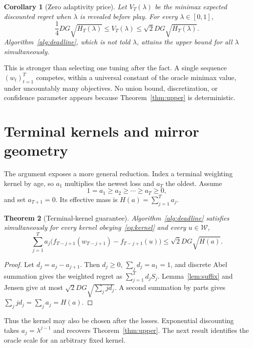 \documentclass{article}
\newtheorem{theorem}{Theorem}
\newtheorem{corollary}[theorem]{Corollary}
\newcommand{\W}{\mathcal W}
\begin{document}
\begin{corollary}[Zero adaptivity price]
\label{cor:minimax}
Let $V_T(\lambda)$ be the minimax expected discounted regret when $\lambda$ is revealed before play. For every $\lambda\in[0,1]$, \[ \frac14DG\sqrt{H_T(\lambda)}\le V_T(\lambda)\le\sqrt2DG\sqrt{H_T(\lambda)}. \] Algorithm~\ref{alg:deadline}, which is not told $\lambda$, attains the upper bound for all $\lambda$ simultaneously.
\end{corollary}

This is stronger than selecting one tuning after the fact. A single sequence $(w_t)_{t=1}^T$ competes, within a universal constant of the oracle minimax value, under uncountably many objectives. No union bound, discretization, or confidence parameter appears because Theorem~\ref{thm:upper} is deterministic.

\section{Terminal kernels and mirror geometry}
\label{sec:general}

The argument exposes a more general reduction. Index a terminal weighting kernel by age, so $a_1$ multiplies the newest loss and $a_T$ the oldest. Assume
\begin{equation}
1=a_1\ge a_2\ge\cdots\ge a_T\ge0,
\label{eq:kernel}
\end{equation}
and set $a_{T+1}=0$. Its effective mass is $H(a)=\sum_{j=1}^Ta_j$.

\begin{theorem}[Terminal-kernel guarantee]
\label{thm:kernel}
Algorithm~\ref{alg:deadline} satisfies simultaneously for every kernel obeying~\eqref{eq:kernel} and every $u\in\W$,
\begin{equation}
\sum_{j=1}^Ta_j\bigl(f_{T-j+1}(w_{T-j+1})-f_{T-j+1}(u)\bigr)
\le\sqrt2DG\sqrt{H(a)}.
\label{eq:kernelbound}
\end{equation}
\end{theorem}

\begin{proof}
Let $d_j=a_j-a_{j+1}$. Then $d_j\ge0$, $\sum_jd_j=a_1=1$, and discrete Abel summation gives the weighted regret as $\sum_{j=1}^Td_jS_j$. Lemma~\ref{lem:suffix} and Jensen give at most $\sqrt2DG\sqrt{\sum_jjd_j}$. A second summation by parts gives $\sum_jjd_j=\sum_ja_j=H(a)$.
\end{proof}

Thus the kernel may also be chosen after the losses. Exponential discounting takes $a_j=\lambda^{j-1}$ and recovers Theorem~\ref{thm:upper}. The next result identifies the oracle scale for an arbitrary fixed kernel.
\end{document}
